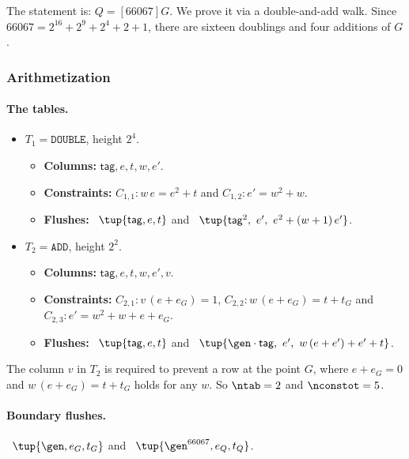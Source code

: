The statement is: $Q=[66067]G$. We prove it via a double-and-add walk. Since $66067=2^{16}+2^{9}+2^{4}+2+1$, there are sixteen doublings and four additions of $G$.

\subsubsection{Arithmetization}

\paragraph{The tables.}

\begin{itemize}[itemsep=3pt,topsep=3pt]
\item $T_1=\texttt{DOUBLE}$, height $2^{4}$.
  \begin{itemize}[itemsep=1pt,topsep=1pt,label={}]
  \item \textbf{Columns:} $\mathsf{tag},e,t,w,e'$.
  \item \textbf{Constraints:} $C_{1,1}: w\,e=e^{2}+t$ and $C_{1,2}: e'=w^{2}+w$.
  \item \textbf{Flushes:} \pull\ $\tup{\mathsf{tag},e,t}$ and \push\ $\tup{\mathsf{tag}^{2},\ e',\ e^{2}+(w+1)\,e'}$.
  \end{itemize}
\item $T_2=\texttt{ADD}$, height $2^{2}$.
  \begin{itemize}[itemsep=1pt,topsep=1pt,label={}]
  \item \textbf{Columns:} $\mathsf{tag},e,t,w,e',v$.
  \item \textbf{Constraints:} $C_{2,1}: v\,(e+e_G)=1$, $C_{2,2}: w\,(e+e_G)=t+t_G$ and $C_{2,3}: e'=w^{2}+w+e+e_G$.
  \item \textbf{Flushes:} \pull\ $\tup{\mathsf{tag},e,t}$ and \push\ $\tup{\gen\cdot\mathsf{tag},\ e',\ w\,(e+e')+e'+t}$.
  \end{itemize}
\end{itemize}
The column $v$ in $T_2$ is required to prevent a row at the point $G$, where $e+e_G=0$ and $w\,(e+e_G)=t+t_G$ holds for any $w$. So $\ntab=2$ and $\nconstot=5$.

\paragraph{Boundary flushes.} \push\ $\tup{\gen,e_G,t_G}$ and \pull\ $\tup{\gen^{66067},e_Q,t_Q}$.

\vspace{5mm}

